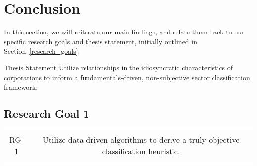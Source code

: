 \documentclass[../main.tex]{subfiles}
\begin{document}
    
\chapter{Conclusion}
    
In this section, we will reiterate our main findings, and relate them back to our specific research goals and thesis statement, initially outlined in Section~\ref{research_goals}.

\vspace{-.5em}

\begin{center}
    \begin{minipage}{0.7\textwidth}
        \begin{bclogo}[couleur=blue!30, arrondi=0.1, logo=\bcloupe, ombre=false]{\;Thesis Statement}
            Utilize relationships in the idiosyncratic characteristics of corporations to inform a fundamentals-driven, non-subjective sector classification framework.
        \end{bclogo}
    \end{minipage}
\end{center}

\vspace{-1.5em}

\section{Research Goal 1}

\begin{table}[h!]
    \centering
    \begin{tabular}{| c | c |}
        \hline
        &  \\
        RG-1 & Utilize data-driven algorithms to derive a truly objective classification heuristic. \\
        & \\
        \hline
    \end{tabular}
\end{table}
\end{document}

